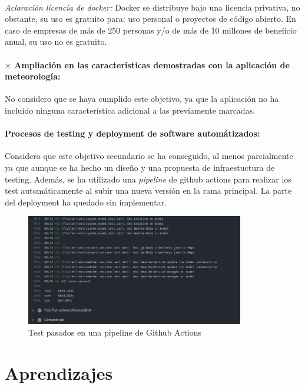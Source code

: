 \paragraph{}
\emph{Aclaración licencia de docker:} Docker se distribuye bajo una licencia privativa,
no obstante, su uso es gratuito para: uso personal o proyectos de código abierto. En
caso de empresas de más de 250 personas y/o de más de 10 millones de beneficio anual,
su uso no es gratuito.

\paragraph{$\times$ Ampliación en las características demostradas con la aplicación de
meteorología:} No considero que se haya cumplido este objetivo, ya que la aplicación
no ha incluido ninguna característica adicional a las previamente marcadas.

\paragraph{\checkmark Procesos de testing y deployment de software automátizados:} Considero
que este objetivo secundario se ha conseguido, al menos parcialmente ya que aunque se
ha hecho un diseño y una propuesta de infraestuctura de testing. Además, se ha utilizado
una \emph{pipeline} de github actions para realizar los test automáticamente al subir
una nueva versión en la rama principal. La parte del deployment ha quedado sin
implementar.

\begin{figure}[H]
    \centering
    \includegraphics[width=0.85\textwidth]{imgs/github-actions-tests}
    \caption{Test pasados en una pipeline de Github Actions}
    \label{imgs:github-actions-tests}
\end{figure}

\section{Aprendizajes}

